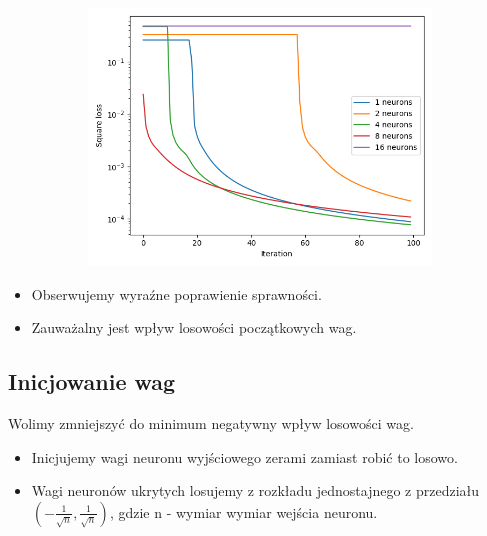 \documentclass[12pt,a4paper]{article}
\begin{document}
\begin{figure}[h]
\medskip
\begin{subfigure}{0.5\textwidth}
  \includegraphics[width=\linewidth]{charts/no_output_activation/noactiv100iter_lr01_randw3.png}
  \caption{}
  \label{}
\end{subfigure}

\end{figure}

\begin{itemize}
  \item   Obserwujemy wyraźne poprawienie sprawności.
  \item   Zauważalny jest wpływ losowości początkowych wag.
\end{itemize}

\pagebreak

\subsection{Inicjowanie wag}

Wolimy zmniejszyć do minimum negatywny wpływ losowości wag.

\begin{itemize}
  \item   Inicjujemy wagi neuronu wyjściowego zerami zamiast robić to losowo.
  \item   Wagi neuronów ukrytych losujemy z rozkładu jednostajnego z przedziału \((-\frac{1}{\sqrt{n}}, \frac{1}{\sqrt{n}})\), gdzie n - wymiar wymiar wejścia neuronu.
\end{itemize}
\end{document}
